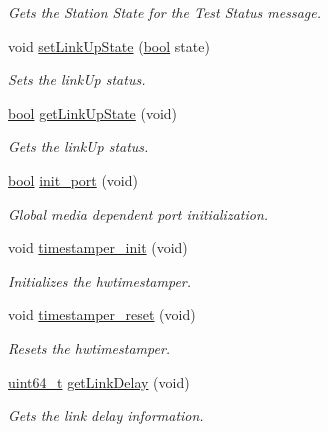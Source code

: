 \begin{DoxyCompactItemize}
\begin{DoxyCompactList}\small\item\em Gets the Station State for the Test Status message. \end{DoxyCompactList}\item 
void \hyperlink{class_ether_port_a04fb3678d82b3b74b6cedf45b3db61cf}{set\+Link\+Up\+State} (\hyperlink{avb__gptp_8h_af6a258d8f3ee5206d682d799316314b1}{bool} state)
\begin{DoxyCompactList}\small\item\em Sets the link\+Up status. \end{DoxyCompactList}\item 
\hyperlink{avb__gptp_8h_af6a258d8f3ee5206d682d799316314b1}{bool} \hyperlink{class_ether_port_aa57d236c4f7db09c470e39dc51dcc6bb}{get\+Link\+Up\+State} (void)
\begin{DoxyCompactList}\small\item\em Gets the link\+Up status. \end{DoxyCompactList}\item 
\hyperlink{avb__gptp_8h_af6a258d8f3ee5206d682d799316314b1}{bool} \hyperlink{class_common_port_ae2f86408116b0a551da01c6f92f03ff9}{init\+\_\+port} (void)
\begin{DoxyCompactList}\small\item\em Global media dependent port initialization. \end{DoxyCompactList}\item 
void \hyperlink{class_common_port_a64530a2fb5ad64bdc7e61b2e37791191}{timestamper\+\_\+init} (void)
\begin{DoxyCompactList}\small\item\em Initializes the hwtimestamper. \end{DoxyCompactList}\item 
void \hyperlink{class_common_port_a8c575c35e2d432d8e401e48fa0cea8f8}{timestamper\+\_\+reset} (void)
\begin{DoxyCompactList}\small\item\em Resets the hwtimestamper. \end{DoxyCompactList}\item 
\hyperlink{parse_8c_aec6fcb673ff035718c238c8c9d544c47}{uint64\+\_\+t} \hyperlink{class_common_port_a62887d159222a2b222fb9cf7c97a3218}{get\+Link\+Delay} (void)
\begin{DoxyCompactList}\small\item\em Gets the link delay information. \end{DoxyCompactList}\item 

\end{DoxyCompactItemize}
